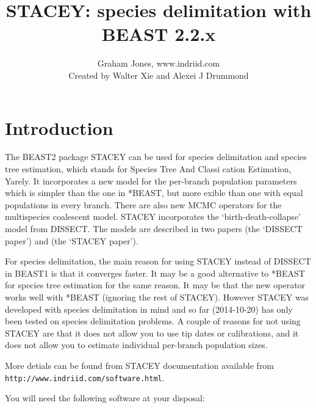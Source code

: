 \documentclass{article}
\newcommand{\BEASTVersion}{2.2.x}
\begin{document}
\title{STACEY: species delimitation with BEAST {\BEASTVersion}}

\author{Graham Jones, www.indriid.com\\
Created by Walter Xie and Alexei J Drummond}

\maketitle

\section{Introduction}

The BEAST2 package STACEY can be used for species delimitation and species tree estimation, which stands for Species Tree And Classication Estimation, Yarely. It incorporates a new model for the per-branch population parameters which is simpler than the one in *BEAST, but more exible than one with equal populations in every branch. There are also new MCMC operators for the multispecies coalescent model. STACEY incorporates the `birth-death-collapse' model from DISSECT. The models are described in two papers \cite{jones2014dissect} (the `DISSECT paper') and \cite{jones2014stacey} (the `STACEY paper').

For species delimitation, the main reason for using STACEY instead of DISSECT in BEAST1 is that it converges faster. It may be a good alternative to *BEAST for species tree estimation for the same reason. It may be that the new operator works well with *BEAST (ignoring the rest of STACEY). However STACEY was developed with species delimitation in mind and so far (2014-10-20) has only been tested on species delimitation problems. A couple of reasons for not using STACEY are that it does not allow you to use tip dates or calibrations, and it does not allow you to estimate individual per-branch population sizes. 

More detials can be found from STACEY documentation available from \texttt{http://www.indriid.com/software.html}.

You will need the following software at your disposal:
\end{document}
